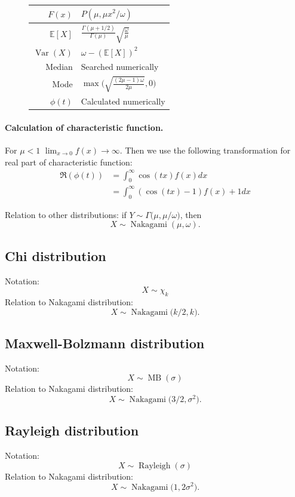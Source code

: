 \documentclass[a4paper,11pt]{article}
\theoremstyle{plain}
\theoremstyle{definition}
\newcommand{\ME}{\mathbb{E}}
\newcommand{\Var}{\operatorname{Var}}
\begin{document}
\begin{figure}[!htb]
\begin{minipage}{0.4\textwidth}
\begin{tabular}{| r | l |}
				\hline
				$F(x)$ & $P(\mu, \mu x^2/\omega) $\\
				\hline
				$\ME[X]$ & $ \frac{\Gamma(\mu + 1/2)}{\Gamma(\mu)} \sqrt{\frac{\omega}{\mu}}  $ \\
				\hline
				$\Var(X)$ & $\omega - (\ME[X])^2$ \\
				\hline
				Median & Searched numerically \\
				\hline
				Mode & $ \max \bigg( \sqrt{\frac{(2\mu-1)\omega}{2\mu}}, 0\bigg)$ \\
				\hline
				$\phi(t)$ & Calculated numerically \\
				\hline
			\end{tabular}
		\end{minipage}
	\end{figure}
	\paragraph{Calculation of characteristic function.} For $\mu < 1$ $\lim_{x \rightarrow 0}f(x) \rightarrow \infty$. Then we use the following transformation for real part of characteristic function:
	\[
	\begin{aligned}
	\Re(\phi(t)) & = \int_{0}^{\infty} \cos(tx) f(x) dx \\ &= \int_{0}^{\infty} (\cos(tx)-1) f(x) + 1 dx
	\end{aligned}
	\]
	
	Relation to other distributions: if $Y \sim \Gamma\big(\mu, \mu/\omega\big)$, then
	\[
	X \sim \operatorname{Nakagami}(\mu, \omega).
	\]
	
	\subsection{Chi distribution}
	Notation:
	\[
	X \sim \chi_k
	\]
	Relation to Nakagami distribution:
	\[
	X \sim \operatorname{Nakagami}\big(k/2, k\big).
	\]
	
	\subsection{Maxwell-Bolzmann distribution}
	Notation:
	\[
	X \sim \operatorname{MB}(\sigma)
	\]
	Relation to Nakagami distribution:
	\[
	X \sim \operatorname{Nakagami}\big(3/2, \sigma^2 \big).
	\]
	
	\subsection{Rayleigh distribution}
	Notation:
	\[
	X \sim \operatorname{Rayleigh}(\sigma)
	\]
	Relation to Nakagami distribution:
	\[
	X \sim \operatorname{Nakagami}\big(1, 2\sigma^2\big).
	\]
\end{document}
